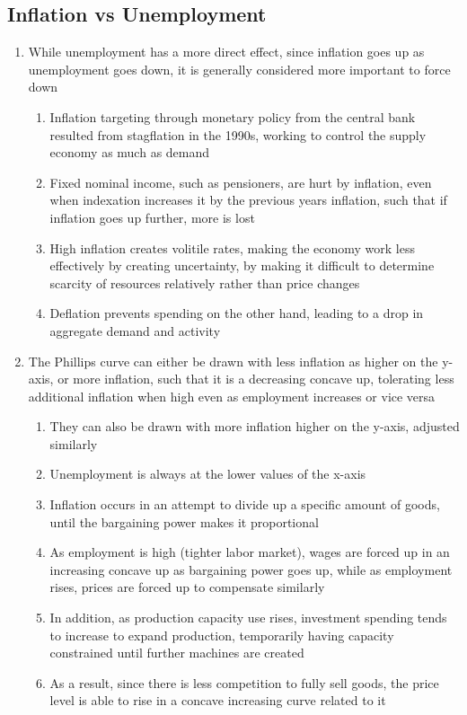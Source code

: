 \documentclass[11 pt, twoside]{article}
\begin{document}
\subsection{Inflation vs Unemployment}
\begin{enumerate}
\item While unemployment has a more direct effect, since inflation goes up as unemployment goes down, it is generally considered more important to force down
\begin{enumerate}
\item Inflation targeting through monetary policy from the central bank resulted from stagflation in the 1990s, working to control the supply economy as much as demand
\item Fixed nominal income, such as pensioners, are hurt by inflation, even when indexation increases it by the previous years inflation, such that if inflation goes up further, more is lost
\item High inflation creates volitile rates, making the economy work less effectively by creating uncertainty, by making it difficult to determine scarcity of resources relatively rather than price changes
\item Deflation prevents spending on the other hand, leading to a drop in aggregate demand and activity
\end{enumerate}
\item The Phillips curve can either be drawn with less inflation as higher on the y-axis, or more inflation, such that it is a decreasing concave up, tolerating less additional inflation when high even as employment increases or vice versa
\begin{enumerate}
\item They can also be drawn with more inflation higher on the y-axis, adjusted similarly
\item Unemployment is always at the lower values of the x-axis
\item Inflation occurs in an attempt to divide up a specific amount of goods, until the bargaining power makes it proportional
\item As employment is high (tighter labor market), wages are forced up in an increasing concave up  as bargaining power goes up, while as employment rises, prices are forced up to compensate similarly
\item In addition, as production capacity use rises, investment spending tends to increase to expand production, temporarily having capacity constrained until further machines are created
\item As a result, since there is less competition to fully sell goods, the price level is able to rise in a concave increasing curve related to it
\end{enumerate}
\end{enumerate}
\end{document}
